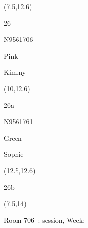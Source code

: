 \documentclass[a4paper]{article}
\newcommand{\myseat}[4]{%
\vspace{-0.1cm}
\parbox[t][2.2cm][t]{3.5cm}{
\small #1 %
\begin{description}
\vspace{-0.1cm}
\item [ID:] #2
\vspace{-0.1cm}
\item [Team:] #3 \normalsize
\vspace{-0.1cm}
\item \normalsize #4
\vspace{-0.1cm}
\end{description}
}
}
\begin{document}
\begin{CJK}{UTF8}{cyberbit}
\begin{textblock}{2.5}(7.5,12.6)
\myseat{26}{N9561706}{Pink}{Kimmy}
\end{textblock}

\begin{textblock}{2.5}(10,12.6)
\myseat{26a}{N9561761}{Green}{Sophie}
\end{textblock}

\begin{textblock}{2.5}(12.5,12.6)
\textblockcolor{}
\myseat{26b}{}{}{}
\end{textblock}

\begin{textblock}{7.5}(7.5,14)
\textblockcolor{}
\parbox[t][2.2cm][t]{9.5cm}{%
\large Room 706, :  session, Week: 
}
\end{textblock}

\end{CJK}
\end{document}
